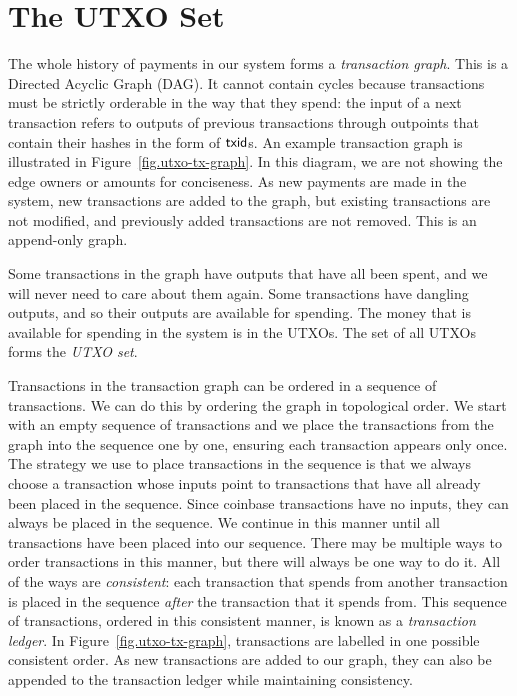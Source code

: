 \section{The UTXO Set}

The whole history of payments in our system forms a \emph{transaction graph}.
This is a Directed Acyclic Graph (DAG). It cannot contain cycles because transactions must be
strictly orderable in the way that they spend: the input of a next transaction refers to
outputs of previous transactions through outpoints that contain their hashes in the form of $\mathsf{txid}$s.
An example transaction graph is illustrated in Figure~\ref{fig.utxo-tx-graph}. In this diagram,
we are not showing the edge owners or amounts for conciseness. As new payments are made in the system,
new transactions are added to the graph, but existing transactions are not modified, and previously
added transactions are not removed. This is an append-only graph.

Some transactions in the graph have outputs that have all been spent, and we will never need to care
about them again. Some transactions have dangling outputs, and so their outputs are available for
spending. The money that is available for spending in the system is in the UTXOs. The set of all UTXOs
forms the \emph{UTXO set}.

Transactions in the transaction graph can be ordered in a sequence of transactions. We can do this
by ordering the graph in topological order. We start with an empty sequence of transactions and we
place the transactions from the graph into the sequence one by one, ensuring each transaction appears
only once. The strategy we use to place transactions in the sequence is that we always choose a transaction
whose inputs point to transactions that have all already
been placed in the sequence. Since coinbase transactions have no inputs, they can always be placed in the sequence.
We continue
in this manner until all transactions have been placed into our sequence. There may be multiple
ways to order transactions in this manner, but there will always be one way to do it. All of the ways
are \emph{consistent}: each transaction
that spends from another transaction is placed in the sequence \emph{after} the transaction that it spends
from. This sequence of transactions, ordered in this consistent manner, is known as a
\emph{transaction ledger}. In Figure~\ref{fig.utxo-tx-graph}, transactions are labelled
in one possible consistent order. As new transactions are added to our graph, they can also be appended
to the transaction ledger while maintaining consistency.


